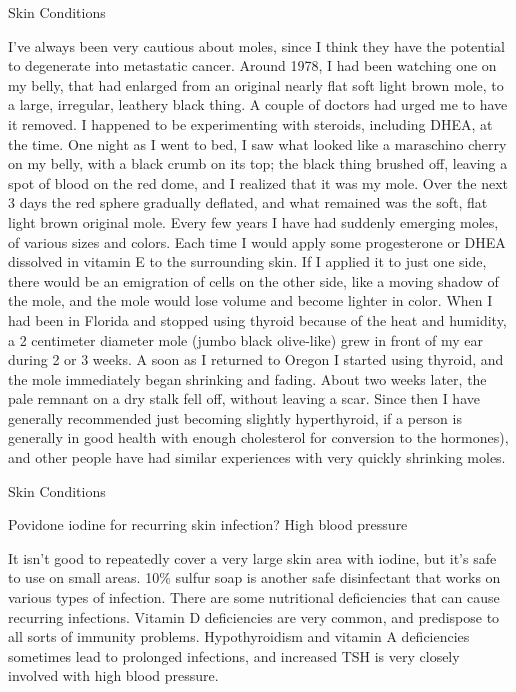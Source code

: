 \documentclass[11pt,oneside,openany,extrafontsizes]{memoir}
\begin{document}
\begin{standalonequote}{Skin Conditions}

    \begin{answer}
        I've always been very cautious about moles, since I think they have the potential to degenerate into metastatic cancer. Around 1978, I had been watching one on my belly, that had enlarged from an original nearly flat soft light brown mole, to a large, irregular, leathery black thing. A couple of doctors had urged me to have it removed. I happened to be experimenting with steroids, including DHEA, at the time. One night as I went to bed, I saw what looked like a maraschino cherry on my belly, with a black crumb on its top; the black thing brushed off, leaving a spot of blood on the red dome, and I realized that it was my mole. Over the next 3 days the red sphere gradually deflated, and what remained was the soft, flat light brown original mole. Every few years I have had suddenly emerging moles, of various sizes and colors. Each time I would apply some progesterone or DHEA dissolved in vitamin E to the surrounding skin. If I applied it to just one side, there would be an emigration of cells on the other side, like a moving shadow of the mole, and the mole would lose volume and become lighter in color. When I had been in Florida and stopped using thyroid because of the heat and humidity, a 2 centimeter diameter mole (jumbo black olive-like) grew in front of my ear during 2 or 3 weeks. A soon as I returned to Oregon I started using thyroid, and the mole immediately began shrinking and fading. About two weeks later, the pale remnant on a dry stalk fell off, without leaving a scar. Since then I have generally recommended just becoming slightly hyperthyroid, if a person is generally in good health with enough cholesterol for conversion to the hormones), and other people have had similar experiences with very quickly shrinking moles.
    \end{answer}
\end{standalonequote}

\begin{qaexchange}{Skin Conditions}

    \begin{question}
        Povidone iodine for recurring skin infection? High blood pressure
    \end{question}

    \begin{answer}
        It isn't good to repeatedly cover a very large skin area with iodine, but it's safe to use on small areas. 10\% sulfur soap is another safe disinfectant that works on various types of infection. There are some nutritional deficiencies that can cause recurring infections. Vitamin D deficiencies are very common, and predispose to all sorts of immunity problems. Hypothyroidism and vitamin A deficiencies sometimes lead to prolonged infections, and increased TSH is very closely involved with high blood pressure.
    \end{answer}
\end{qaexchange}
\end{document}
